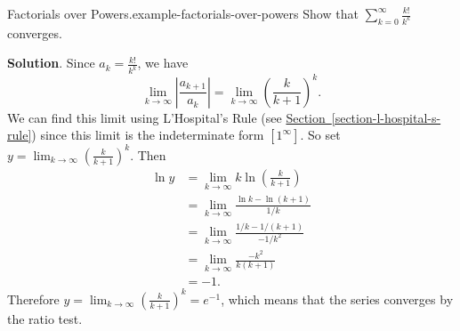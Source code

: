 \documentclass[10pt,]{book}
\numberwithin{equation}{section}
\newcommand{\amp}{&}
\begin{document}
\begin{example}{Factorials over Powers.}{example-factorials-over-powers}%
\hypertarget{p-921}{}%
Show that \(\sum_{k=0}^{\infty}\frac{k!}{k^{k}}\) converges.%
\par\smallskip%
\noindent\textbf{Solution}.\hypertarget{solution-189}{}\quad%
\hypertarget{p-922}{}%
Since \(a_{k} = \frac{k!}{k^{k}}\), we have%
\begin{equation*}
\lim_{k\to\infty}\left|\frac{a_{k+1}}{a_{k}}\right| = \lim_{k\to\infty}\left(\frac{k}{k+1}\right)^{k}\text{.}
\end{equation*}
We can find this limit using L'Hospital's Rule (see \hyperref[section-l-hospital-s-rule]{Section~\ref{section-l-hospital-s-rule}}) since this limit is the indeterminate form \([1^{\infty}]\). So set \(y = \lim_{k\to\infty}\left(\frac{k}{k+1}\right)^{k}\). Then%
\begin{align*}
\ln y \amp = \lim_{k\to\infty}k\ln\left(\frac{k}{k+1}\right) \\
\amp = \lim_{k\to\infty}\frac{\ln k - \ln(k+1)}{1/k} \\
\amp = \lim_{k\to\infty}\frac{1/k - 1/(k+1)}{-1/k^{2}} \\
\amp = \lim_{k\to\infty}\frac{-k^{2}}{k(k+1)} \\
\amp = -1 \text{.}
\end{align*}
Therefore \(y = \lim_{k\to\infty}\left(\frac{k}{k+1}\right)^{k} = e^{-1}\), which means that the series converges by the ratio test.%
\end{example}
%
%
\typeout{************************************************}
\typeout{************************************************}
%
\end{document}
